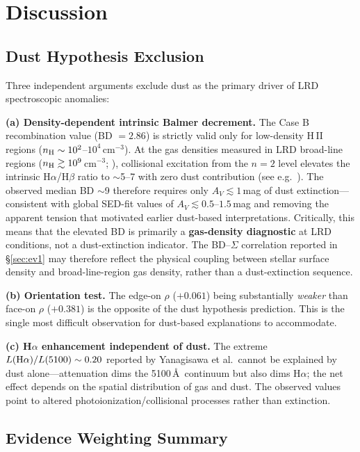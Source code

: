 \documentclass[twocolumn,linenumbers]{aastex631}
\begin{document}
\section{Discussion} \label{sec:discussion}

\subsection{Dust Hypothesis Exclusion} \label{sec:dust_exclusion}

Three independent arguments exclude dust as the primary driver of LRD spectroscopic anomalies:

\textbf{(a) Density-dependent intrinsic Balmer decrement.} The Case B recombination value (BD $= 2.86$) is strictly valid only for low-density H\,{\sc II} regions ($n_{\rm H} \sim 10^2$--$10^4$\,cm$^{-3}$). At the gas densities measured in LRD broad-line regions ($n_{\rm H} \gtrsim 10^9$\,cm$^{-3}$; \citealt{Chen2026ABCD}), collisional excitation from the $n=2$ level elevates the intrinsic H$\alpha$/H$\beta$ ratio to $\sim$5--7 with zero dust contribution (see e.g.\ \citealt{Osterbrock1989}). The observed median BD $\sim$9 therefore requires only $A_V \lesssim 1$\,mag of dust extinction---consistent with global SED-fit values of $A_V \lesssim 0.5$--$1.5$\,mag and removing the apparent tension that motivated earlier dust-based interpretations. Critically, this means that the elevated BD is primarily a \textbf{gas-density diagnostic} at LRD conditions, not a dust-extinction indicator. The BD--$\Sigma$ correlation reported in \S\ref{sec:ev1} may therefore reflect the physical coupling between stellar surface density and broad-line-region gas density, rather than a dust-extinction sequence.

\textbf{(b) Orientation test.} The edge-on $\rho$ ($+0.061$) being substantially \textit{weaker} than face-on $\rho$ ($+0.381$) is the opposite of the dust hypothesis prediction. This is the single most difficult observation for dust-based explanations to accommodate.

\textbf{(c) H$\alpha$ enhancement independent of dust.} The extreme $L({\rm H}\alpha)/L(5100) \sim 0.20$ reported by Yanagisawa et al.\ cannot be explained by dust alone---attenuation dims the 5100\,\AA\ continuum but also dims H$\alpha$; the net effect depends on the spatial distribution of gas and dust. The observed values point to altered photoionization/collisional processes rather than extinction.

\subsection{Evidence Weighting Summary}
\end{document}
